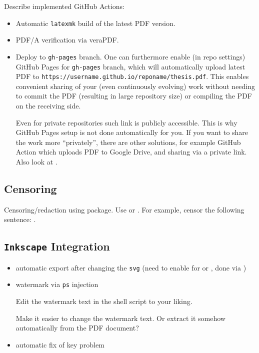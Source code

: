 Describe implemented \textsf{GitHub Actions}:
\begin{itemize}
    \item Automatic \texttt{latexmk} build of the latest PDF version.
    \item PDF/A verification via \textsf{veraPDF}.
    \item Deploy to \texttt{gh-pages} branch.
          One can furthermore enable (in repo settings) \textsf{GitHub Pages} for \texttt{gh-pages} branch, which will automatically upload latest PDF to \texttt{https://username.github.io/reponame/thesis.pdf}.
          This enables convenient sharing of your (even continuously evolving) work without needing to commit the PDF (resulting in large repository size) or compiling the PDF on the receiving side.
          \begin{remark}
              Even for private repositories such link is publicly accessible.
              This is why \textsf{GitHub Pages} setup is not done automatically for you.
              If you want to share the work more \enquote{privately}, there are other solutions, for example \textsf{GitHub Action} which uploads PDF to \textsf{Google Drive}, and sharing via a private link.
              Also look at .
          \end{remark}
\end{itemize}

\subsection{Censoring}%
\label{sub:Censoring}

Censoring/redaction using  package.
Use \macro{\censor} or \macro{\censorbox}.
For example, censor the following sentence: .

\subsection{\texorpdfstring{\texttt{Inkscape}}{Inkscape} Integration}%
\label{sub:Inkscape Integration}

\begin{itemize}
    \item automatic export after changing the \texttt{svg} (need to enable  for  or , done via )
    \item watermark via \texttt{ps} injection
          \begin{remark}
              Edit the watermark text in the shell script  to your liking.
          \end{remark}
          \begin{Todo}
              Make it easier to change the watermark text.
              Or extract it somehow automatically from the PDF document?
          \end{Todo}
    \item automatic fix of  key problem
\end{itemize}


